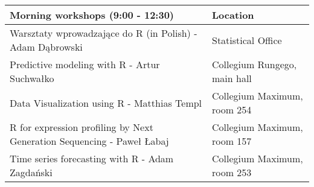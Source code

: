 \begingroup\fontsize{9pt}{10pt}\selectfont
\begin{longtable}{|p{8.2cm}|p{4.6cm}|}
  \hline
Morning workshops (9:00 - 12:30) & Location \\ 
  \hline
Warsztaty wprowadzające do R (in Polish) - Adam Dąbrowski & Statistical Office \\ 
  Predictive modeling with R - Artur Suchwałko & Collegium Rungego, main hall \\ 
  Data Visualization using R - Matthias Templ & Collegium Maximum, room 254 \\ 
  R for expression profiling by Next Generation Sequencing - Paweł Łabaj & Collegium Maximum, room 157 \\ 
  Time series forecasting with R - Adam Zagdański & Collegium Maximum, room 253 \\ 
   \hline
\end{longtable}
\endgroup
